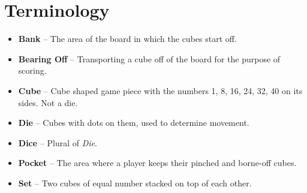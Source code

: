 \section{Terminology}
\begin{itemize}
    \item \textbf{Bank} -- The area of the board in which the cubes start off.
    \item \textbf{Bearing Off} -- Transporting a cube off of the board for the purpose of scoring.
    \item \textbf{Cube} -- Cube shaped game piece with the numbers 1, 8, 16, 24, 32, 40 on its sides. Not a die.
    \item \textbf{Die} -- Cubes with dots on them, used to determine movement.
    \item \textbf{Dice} -- Plural of \textit{Die}.
    \item \textbf{Pocket} -- The area where a player keeps their pinched and borne-off cubes.
    \item \textbf{Set} -- Two cubes of equal number stacked on top of each other.
\end{itemize}